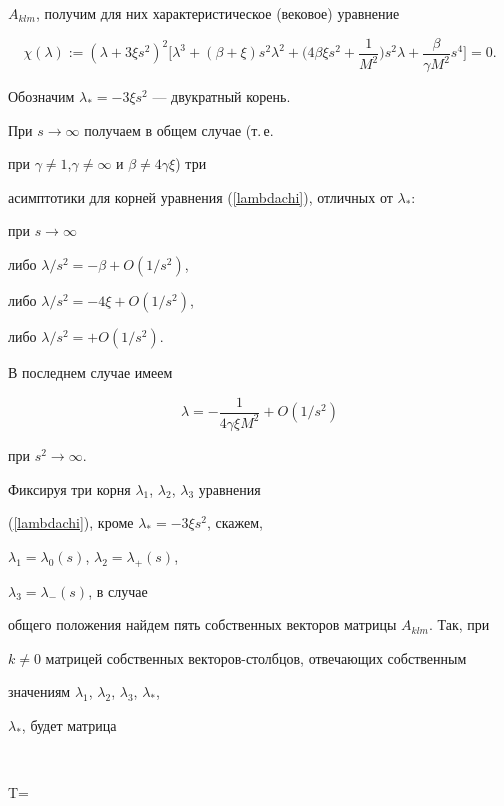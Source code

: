 $A_{klm}$, получим для них характеристическое (вековое) уравнение


\begin{equation}


\label{lambdachi}


\chi (\lambda):=(\lambda +3\xi s^2)^2


\bigg[\lambda^3+(\beta+\xi)s^2\lambda^2


+\bigg(4\beta\xi s^2+\frac{1}{M^2}\bigg)s^2\lambda+


\frac{\beta}{\gamma M^2}s^4\bigg]=0.


\end{equation}


Обозначим $\lambda_*=-3\xi s^2 $ --- двукратный корень.


При $s\rightarrow\infty$ получаем в общем случае (т.\,е.


при $\gamma\neq 1$,$\gamma\neq\infty$ и $\beta\neq 4\gamma\xi$) три


асимптотики для корней уравнения (\ref{lambdachi}), отличных от $\lambda_*$:


при $s\rightarrow\infty$


либо $\lambda/s^2=-\beta+O(1/s^2)$,


либо $\lambda/s^2=-4\xi+O(1/s^2)$,


либо $\lambda/s^2=+O(1/s^2)$.


В последнем случае имеем


$$


\lambda=-\frac{1}{4\gamma\xi M^2}+O(1/s^2)


$$


при $s^2\rightarrow\infty$.


Фиксируя три корня $\lambda_1$, $\lambda_2$, $\lambda_3$ уравнения


(\ref{lambdachi}), кроме $\lambda_*=-3\xi s^2$, скажем,


$\lambda_1=\lambda_0(s)$, $\lambda_2=\lambda_+(s)$,


$\lambda_3=\lambda_-(s)$, в случае


общего положения найдем пять собственных векторов матрицы $A_{klm}$. Так, при


$k\neq 0$ матрицей собственных векторов-столбцов, отвечающих собственным


значениям $\lambda_1$, $\lambda_2$, $\lambda_3$, $\lambda_*$,


$\lambda_*$, будет матрица


$$


T=


